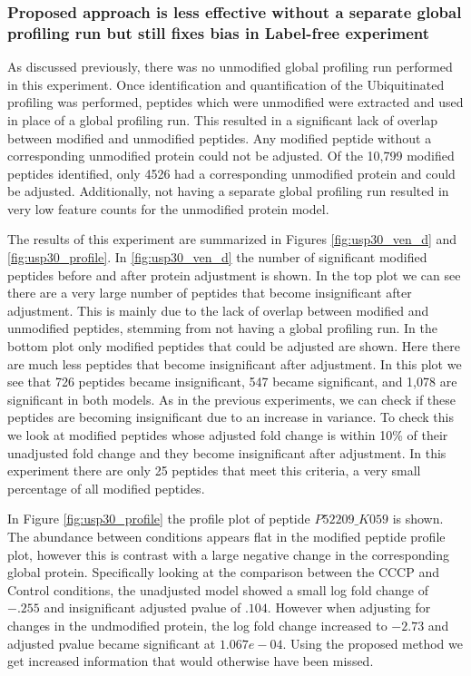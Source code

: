 \documentclass[mcp]{article}
\numberwithin{figure}{section} %
\numberwithin{table}{section}
\begin{document}
\subsubsection*{Proposed approach is less effective without a separate global profiling run but still fixes bias in Label-free experiment}

As discussed previously, there was no unmodified global profiling run performed in this experiment. Once identification and quantification of the Ubiquitinated profiling was performed, peptides which were unmodified were extracted and used in place of a global profiling run. This resulted in a significant lack of overlap between modified and unmodified peptides. Any modified peptide without a corresponding unmodified protein could not be adjusted. Of the 10,799 modified peptides identified, only 4526 had a corresponding unmodified protein and could be adjusted. Additionally, not having a separate global profiling run resulted in very low feature counts for the unmodified protein model.

The results of this experiment are summarized in Figures \ref{fig:usp30_ven_d} and \ref{fig:usp30_profile}. In \ref{fig:usp30_ven_d} the number of significant modified peptides before and after protein adjustment is shown. In the top plot we can see there are a very large number of peptides that become insignificant after adjustment. This is mainly due to the lack of overlap between modified and unmodified peptides, stemming from not having a global profiling run. In the bottom plot only modified peptides that could be adjusted are shown. Here there are much less peptides that become insignificant after adjustment. In this plot we see that 726 peptides became insignificant, 547 became significant, and 1,078 are significant in both models. As in the previous experiments, we can check if these peptides are becoming insignificant due to an increase in variance. To check this we look at modified peptides whose adjusted fold change is within 10\% of their unadjusted fold change and they become insignificant after adjustment. In this experiment there are only 25 peptides that meet this criteria, a very small percentage of all modified peptides.

In Figure \ref{fig:usp30_profile} the profile plot of peptide $P52209\_K059$ is shown. The abundance between conditions appears flat in the modified peptide profile plot, however this is contrast with a large negative change in the corresponding global protein. Specifically looking at the comparison between the CCCP and Control conditions, the unadjusted model showed a small log fold change of $-.255$ and insignificant adjusted pvalue of $.104$. However when adjusting for changes in the undmodified protein, the log fold change increased to $-2.73$ and adjusted pvalue became significant at $1.067e-04$. Using the proposed method we get increased information that would otherwise have been missed.
\end{document}
